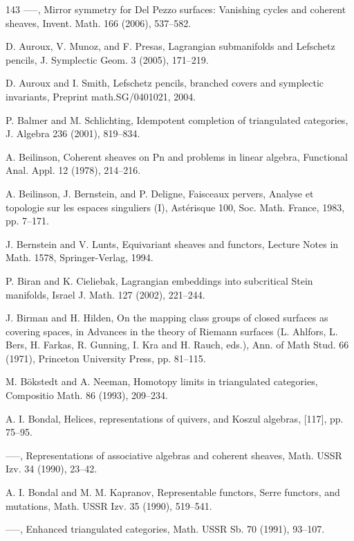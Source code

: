 \begin{thebibliography}{143}
 —–, Mirror symmetry for Del Pezzo surfaces: Vanishing cycles and coherent sheaves, Invent. Math. 166 (2006), 537–582.

 D. Auroux, V. Munoz, and F. Presas, Lagrangian submanifolds and Lefschetz pencils, J. Symplectic Geom. 3 (2005), 171–219.

 D. Auroux and I. Smith, Lefschetz pencils, branched covers and symplectic invariants, Preprint math.SG/0401021, 2004.

 P. Balmer and M. Schlichting, Idempotent completion of triangulated categories, J. Algebra 236 (2001), 819–834.

 A. Beilinson, Coherent sheaves on Pn and problems in linear algebra, Functional Anal. Appl. 12 (1978), 214–216.

 A. Beilinson, J. Bernstein, and P. Deligne, Faisceaux pervers, Analyse et topologie sur les espaces singuliers (I), Astérisque 100, Soc. Math. France, 1983, pp. 7–171.

 J. Bernstein and V. Lunts, Equivariant sheaves and functors, Lecture Notes in Math. 1578, Springer-Verlag, 1994.

 P. Biran and K. Cieliebak, Lagrangian embeddings into subcritical Stein manifolds, Israel J. Math. 127 (2002), 221–244.

 J. Birman and H. Hilden, On the mapping class groups of closed surfaces as covering spaces, in Advances in the theory of Riemann surfaces (L. Ahlfors, L. Bers, H. Farkas, R. Gunning, I. Kra and H. Rauch, eds.), Ann. of Math Stud. 66 (1971), Princeton University Press, pp. 81–115.

 M. Bökstedt and A. Neeman, Homotopy limits in triangulated categories, Compositio Math. 86 (1993), 209–234.

 A. I. Bondal, Helices, representations of quivers, and Koszul algebras, [117], pp. 75–95.

 —–, Representations of associative algebras and coherent sheaves, Math. USSR Izv. 34 (1990), 23–42.

 A. I. Bondal and M. M. Kapranov, Representable functors, Serre functors, and mutations, Math. USSR Izv. 35 (1990), 519–541.

 —–, Enhanced triangulated categories, Math. USSR Sb. 70 (1991), 93–107.


\end{thebibliography}
